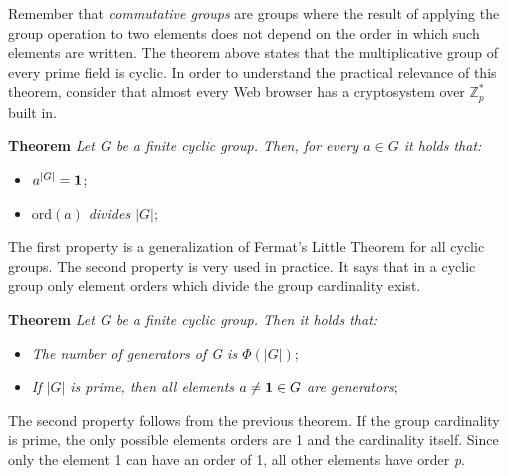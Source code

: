 Remember that \textit{commutative groups} are groups where the result of applying the group operation to two elements does not depend on the order in which such elements are written. The theorem above states that the multiplicative group of every prime field is cyclic. In order to understand the practical relevance of this theorem, consider that almost every Web browser has a cryptosystem over $\mathbb{Z}_p^*$ built in.
\begin{framed}
    \hfill\break\textbf{Theorem} \textit{Let G be a finite cyclic group. Then, for every $a\in G$ it holds that:}
    \begin{itemize}
        \item $a^{|G|}=\textbf{1}$;
        \item $\text{ord}(a)$ \textit{divides $|G|$};
    \end{itemize}
\end{framed}
The first property is a generalization of Fermat's Little Theorem for all cyclic groups. The second property is very used in practice. It says that in a cyclic group only element orders which divide the group cardinality exist.

\newpage
\begin{framed}
    \hfill\break\textbf{Theorem} \textit{Let G be a finite cyclic group. Then it holds that:}
    \begin{itemize}
        \item \textit{The number of generators of G is $\Phi(|G|)$};
        \item \textit{If $|G|$ is prime, then all elements} $a\not=\textbf{1}\in G$ \textit{are generators};
    \end{itemize}
\end{framed}
The second property follows from the previous theorem. If the group cardinality is prime, the only possible elements orders are 1 and the cardinality itself. Since only the element 1 can have an order of 1, all other elements have order \textit{p}.

